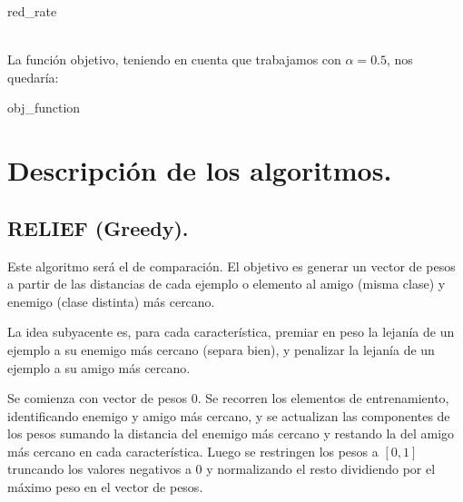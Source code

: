 \documentclass[11pt,a4paper]{article}
\theoremstyle{definition}
\begin{document}
	\begin{algorithm}[H]
		\caption{red\_rate}
	\end{algorithm} ~\\
	
	La función objetivo, teniendo en cuenta que trabajamos con $\alpha=0.5$, nos quedaría:\\
	
	\begin{algorithm}[H]
		\caption{obj\_function}
	\end{algorithm}
	
	\section{Descripción de los algoritmos.}
	\subsection{RELIEF (Greedy).}
	Este algoritmo será el de comparación. El objetivo es generar un vector de pesos a partir de las distancias de cada ejemplo o elemento al amigo (misma clase) y enemigo (clase distinta) más cercano.
	
	La idea subyacente es, para cada característica, premiar en peso la lejanía de un ejemplo a su enemigo más cercano (separa bien), y penalizar la lejanía de un ejemplo a su amigo más cercano.
	
	Se comienza con vector de pesos 0. Se recorren los elementos de entrenamiento, identificando enemigo y amigo más cercano, y se actualizan las componentes de los pesos sumando la distancia del enemigo más cercano y restando la del amigo más cercano en cada característica. Luego se restringen los pesos a $[0,1]$ truncando los valores negativos a 0 y normalizando el resto dividiendo por el máximo peso en el vector de pesos.
	
\end{document}
